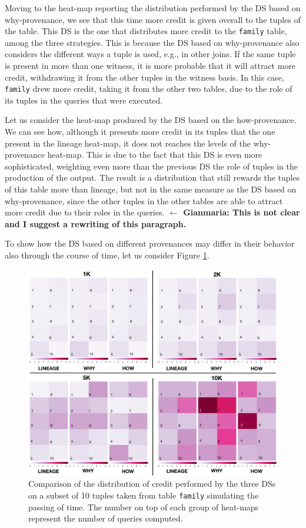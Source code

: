 Moving to the heat-map reporting the distribution performed by the DS based on why-provenance, we see that this time more credit is given overall to the tuples of the table. This DS is the one that distributes more credit to the \texttt{family} table, among the three strategies. 
This is because the DS based on why-provenance also considers the different ways a tuple is used, e.g., in other joins. If the same tuple is present in more than one witness, it is more probable that it will attract more credit, withdrawing it from the other tuples in the witness basis. In this case, \texttt{family} drew more credit, taking it from the other two tables, due to the role of its tuples in the queries that were executed.

Let us consider the heat-map produced by the DS based on the how-provenance. We  can see how, although it presents more credit in its tuples that the one present in the lineage heat-map, it does not reaches the levels of the why-provenance heat-map.
This is due to the fact that this DS is even more sophisticated, weighting even more than the previous DS the role of tuples in the production of the output. 
The result is a distribution that still rewards the tuples of this table more than lineage, but not in the same measure as the DS based on why-provenance, since the other tuples in the other tables are able to attract more credit due to their roles in the queries. \textbf{ $\leftarrow$  Gianmaria: This is not clear and I suggest a rewriting of this paragraph.}


To show how the DS based on different provenances may differ in their behavior also through the course of time, let us consider Figure \ref{fig:comparison}.

\begin{figure}[t]
  \includegraphics[width=\textwidth]{figures/comparison_2}
  \caption{Comparison of the distribution of credit performed by the three DSs on a subset of 10 tuples taken from table \texttt{family} simulating the passing of time. The number on top of each group of heat-maps represent the number of queries computed.}
  \label{fig:comparison}
\end{figure}


